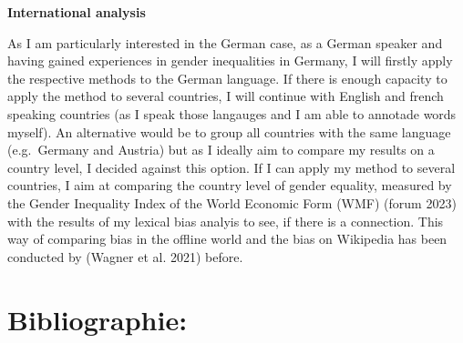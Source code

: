 \documentclass[
]{article}
\begin{document}
\textbf{International analysis}

As I am particularly interested in the German case, as a German speaker
and having gained experiences in gender inequalities in Germany, I will
firstly apply the respective methods to the German language. If there is
enough capacity to apply the method to several countries, I will
continue with English and french speaking countries (as I speak those
langauges and I am able to annotade words myself). An alternative would
be to group all countries with the same language (e.g.~Germany and
Austria) but as I ideally aim to compare my results on a country level,
I decided against this option. If I can apply my method to several
countries, I aim at comparing the country level of gender equality,
measured by the Gender Inequality Index of the World Economic Form (WMF)
(forum 2023) with the results of my lexical bias analyis to see, if
there is a connection. This way of comparing bias in the offline world
and the bias on Wikipedia has been conducted by (Wagner et al. 2021)
before.

\hypertarget{bibliographie}{%
\section{Bibliographie:}\label{bibliographie}}
\end{document}
